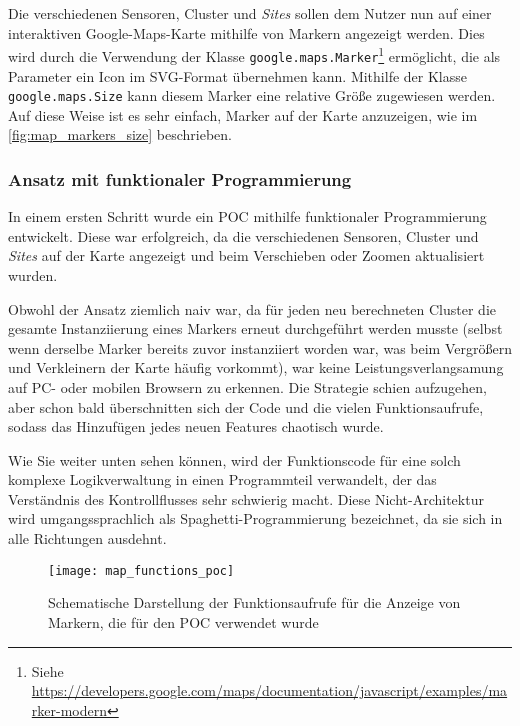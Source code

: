 Die verschiedenen Sensoren, Cluster und \textit{Sites} sollen dem Nutzer nun auf einer interaktiven Google-Maps-Karte mithilfe von Markern angezeigt werden.
Dies wird durch die Verwendung der Klasse \lstinline{google.maps.Marker}\footnote{Siehe \href{https://developers.google.com/maps/documentation/javascript/examples/marker-modern}{https://developers.google.com/maps/documentation/javascript/examples/marker-modern}} ermöglicht, die als Parameter ein Icon im \ac{SVG}-Format übernehmen kann.
Mithilfe der Klasse \lstinline{google.maps.Size} kann diesem Marker eine relative Größe zugewiesen werden.
Auf diese Weise ist es sehr einfach, Marker auf der Karte anzuzeigen, wie im \ref{fig:map_markers_size} beschrieben.

\subsubsection{Ansatz mit funktionaler Programmierung} \label{sec:implementation_functional}

In einem ersten Schritt wurde ein \ac{POC} mithilfe funktionaler Programmierung entwickelt.
Diese war erfolgreich, da die verschiedenen Sensoren, Cluster und \textit{Sites} auf der Karte angezeigt und beim Verschieben oder Zoomen aktualisiert wurden.

Obwohl der Ansatz ziemlich naiv war, da für jeden neu berechneten Cluster die gesamte Instanziierung eines Markers erneut durchgeführt werden musste (selbst wenn derselbe Marker bereits zuvor instanziiert worden war, was beim Vergrößern und Verkleinern der Karte häufig vorkommt), war keine Leistungsverlangsamung auf PC- oder mobilen Browsern zu erkennen.
Die Strategie schien aufzugehen, aber schon bald überschnitten sich der Code und die vielen Funktionsaufrufe, sodass das Hinzufügen jedes neuen Features chaotisch wurde.

Wie Sie weiter unten sehen können, wird der Funktionscode für eine solch komplexe Logikverwaltung in einen Programmteil verwandelt, der das Verständnis des Kontrollflusses sehr schwierig macht.
Diese Nicht-Architektur wird umgangssprachlich als Spaghetti-Programmierung bezeichnet, da sie sich in alle Richtungen ausdehnt\cite{spaghetti}.

\begin{figure}[H]
  \centering
  \texttt{[image: map\_functions\_poc]}
  \caption{Schematische Darstellung der Funktionsaufrufe für die Anzeige von Markern, die für den \ac{POC} verwendet wurde}
  \label{fig:map_functions_poc}
\end{figure}

